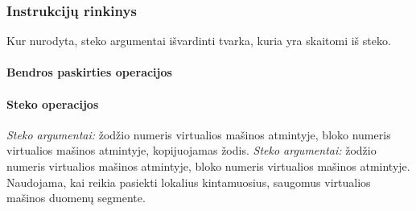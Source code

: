 \documentclass{scrartcl}
\begin{document}
            \subsubsection{Instrukcijų rinkinys}
                Kur nurodyta, steko argumentai išvardinti tvarka, kuria yra skaitomi iš steko.
                \paragraph{Bendros paskirties operacijos}
                \paragraph{Steko operacijos}
                    \emph{Steko argumentai:} žodžio numeris virtualios mašinos atmintyje, bloko numeris virtualios mašinos atmintyje, kopijuojamas žodis.
                    \emph{Steko argumentai:} žodžio numeris virtualios mašinos atmintyje, bloko numeris virtualios mašinos atmintyje.
                     Naudojama, kai reikia pasiekti lokalius kintamuosius, saugomus virtualios mašinos duomenų segmente.
\end{document}
